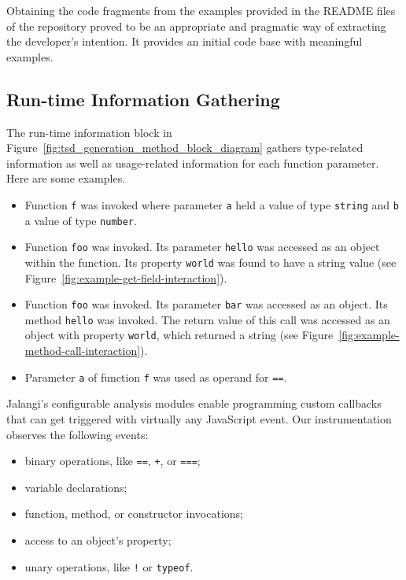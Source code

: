 \documentclass[sigplan,screen]{acmart}
\newcommand{\figref}[1]{Figure~\ref{#1}}
\begin{document}
Obtaining the code fragments from the examples provided in the
README files of the repository proved to be an
appropriate and pragmatic way of extracting the developer's
intention. It provides an initial code base with meaningful
examples.

\subsection{Run-time Information Gathering}
\label{sec:run-time-information}
The run-time information block in
\figref{fig:tsd_generation_method_block_diagram} gathers
type-related information as well as usage-related information for each function parameter.
Here are some examples.

\begin{itemize}
  \item Function \lstinline{f} was invoked where parameter
    \lstinline{a} held a value of type \lstinline{string} and
    \lstinline{b} a value of type \lstinline{number}. 
  \item Function \lstinline{foo} was invoked. Its parameter
    \lstinline{hello} was accessed as an object within the
    function. Its property \lstinline{world} was found to have a
    string value (see Figure~\ref{fig:example-get-field-interaction}).
  \item Function \lstinline{foo} was invoked. Its parameter
    \lstinline{bar} was accessed as an object. Its method
    \lstinline{hello} was invoked. The return value of this call was
    accessed as an object with property \lstinline{world}, which
    returned a string (see Figure~\ref{fig:example-method-call-interaction}).
  \item Parameter \lstinline{a} of function \lstinline{f} was used as
    operand for \lstinline{==}. 
\end{itemize}

Jalangi's configurable analysis modules enable
programming custom callbacks that can get triggered with virtually any
JavaScript event. Our instrumentation observes the following events: 
\begin{itemize}
  \item binary operations, like \lstinline{==}, \lstinline{+}, or
    \lstinline{===};
  \item variable declarations;
  \item function, method, or constructor invocations;
  \item access to an object's property;
  \item unary operations, like \lstinline{!} or \lstinline{typeof}.
\end{itemize}
\end{document}
